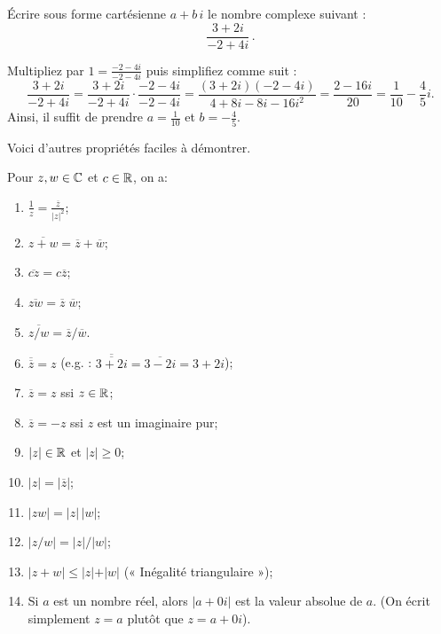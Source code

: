 \begin{myprob}
Écrire sous forme cartésienne $a+b\,i$ le nombre complexe suivant :
$$
\frac{3+2i}{-2+4i}\, .
$$

\begin{mysol}
Multipliez par $1 = \frac{-2-4i}{-2-4i}$ puis simplifiez comme suit :
$$
\frac{3+2i}{-2 + 4i} = \frac{3+2i}{-2 + 4i}\cdot \frac{-2-4i}{-2-4i} =
\frac{(3+2i)(-2-4i)}{4+8i-8i-16i^2} = \frac{2-16i}{20} = \frac{1}{10} - \frac{4}{5}i.
$$
Ainsi, il suffit de prendre $a=\frac{1}{10}$ et $b=-\frac45$.
\end{mysol}
\end{myprob}

Voici d'autres propriétés faciles à démontrer.

\begin{lemma}
 Pour
$z,w \in \mathbb{C}$ et $c\in \mathbb{R}$, on a:
\begin{enumerate}
\item $\frac{1}{z} = \frac{\overline{z}}{\vert z \vert^2}$;\smallskip
\item $\overline{z+w} = \overline{z} + \overline{w}$;
\item $\overline{cz} = c\overline{z}$;
\item $\overline{zw} =\overline{z}\; \overline{w}$;
\item $\overline{z/w} = \overline{z}/\overline{w}$.\smallskip
\item $\overline{\overline{z}} = z$  (e.g. : $\overline{\overline{3+2i}}= \overline{3-2i} = 3+2i$);
\item $\overline{z} = z$ ssi $z \in \mathbb{R}$;
\item $\overline{z} = -z$ ssi $z$ est un imaginaire pur;
\item $\vert z \vert  \in \mathbb{R}$ et $\vert z \vert \geq 0$;
\item $\vert z \vert = \vert \overline{z} \vert$;
\item $\vert zw \vert = \vert z \vert \, \vert w \vert$;
\item $\vert z/w \vert = \vert z \vert / \vert w \vert$;
\item $\vert z + w \vert \leq \vert z \vert + \vert w \vert$ (« Inégalité triangulaire »);
\item Si $a$ est un nombre réel, alors $\vert a + 0i \vert$ est la valeur absolue de $a$.
  (On écrit simplement $z=a$ plutôt que $z=a+0i$).
\end{enumerate}


\end{lemma}


